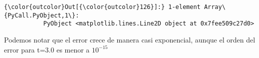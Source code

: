 \documentclass[11pt]{article}
\begin{document}
\begin{Verbatim}[commandchars=\\\{\}]
{\color{outcolor}Out[{\color{outcolor}126}]:} 1-element Array\{PyCall.PyObject,1\}:
           PyObject <matplotlib.lines.Line2D object at 0x7fee509c27d0>
\end{Verbatim}
            
    Podemos notar que el error crece de manera casi exponencial, aunque el
orden del error para t=3.0 es menor a \(10^{-15}\)


    
    
    
    
\end{document}
